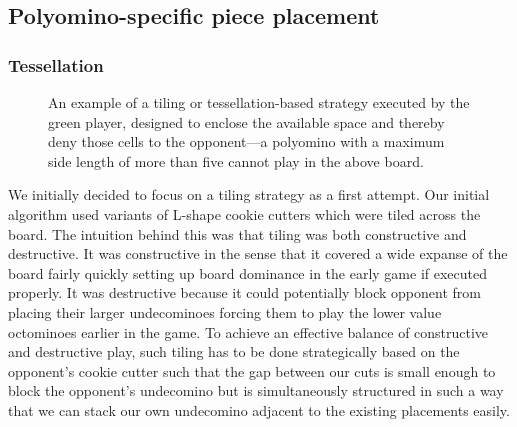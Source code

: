 \documentclass{scrartcl}
\begin{document}
\subsection{Polyomino-specific piece placement}

\subsubsection{Tessellation}

\begin{figure}[h]
\centering
{}
\caption{An example of a tiling or tessellation-based strategy executed by the green player, designed to enclose the available space and thereby deny those cells to the opponent---a polyomino with a maximum side length of more than five cannot play in the above board.}\label{fig:tessel1}
\end{figure}

We initially decided to focus on a tiling strategy as a first attempt. Our initial algorithm used variants of L-shape cookie cutters which were tiled across the board. The intuition behind this was that tiling was both constructive and destructive. It was constructive in the sense that it covered a wide expanse of the board fairly quickly setting up board dominance in the early game if executed properly. It was destructive because it could potentially block opponent from placing their larger undecominoes forcing them to play the lower value octominoes earlier in the game. To achieve an effective balance of constructive and destructive play, such tiling has to be done strategically based on the opponent's cookie cutter such that the gap between our cuts is small enough to block the opponent's undecomino but is simultaneously structured in such a way that we can stack our own undecomino adjacent to the existing placements easily.
\end{document}

